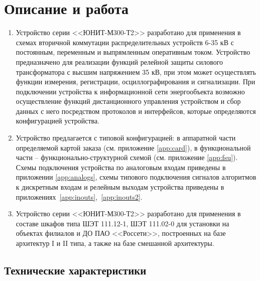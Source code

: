 \color{uniblue}\section[Описание и работа]{Описание и работа}
\color{black}

\color{black}

\begin{enumerate}

\item
Устройство серии <<ЮНИТ-М300-Т2>> разработано для применения в схемах вторичной коммутации распределительных устройств 6-35 кВ с постоянным, переменным и выпрямленным оперативным током. Устройство предназначено для реализации функций релейной защиты силового трансформатора с высшим напряжением 35 кВ, при этом может осуществлять функции измерения, регистрации, осциллографирования и сигнализации. При подключении устройства к информационной сети энергообъекта возможно осуществление функций дистанционного управления устройством и сбор данных с него посредством протоколов и интерфейсов, которые определяются конфигурацией устройства.
\item
Устройство предлагается с типовой конфигурацией: в аппаратной части определяемой картой заказа (см. приложение \ref{app:card}), в функциональной части -- функционально-структурной схемой (см. приложение \ref{app:fsu}). Схемы подключения устройства по аналоговым входам приведены в приложении \ref{app:analogs}, схемы типового подключения сигналов алгоритмов к дискретным входам и релейным выходам устройства приведены в приложениях~\ref{app:inouts},~\ref{app:inouts2}.
\item
Устройство серии <<ЮНИТ-М300-Т2>> разработано для применения в составе шкафов типа ШЭТ 111.12-1, ШЭТ 111.02-0 для установки на объектах филиалов и ДО ПАО <<Россети>>, построенных на базе архитектур I и II типа, а также на базе смешанной архитектуры.

\end{enumerate}


\color{uniblue}\subsection{Технические характеристики}
\color{black}

